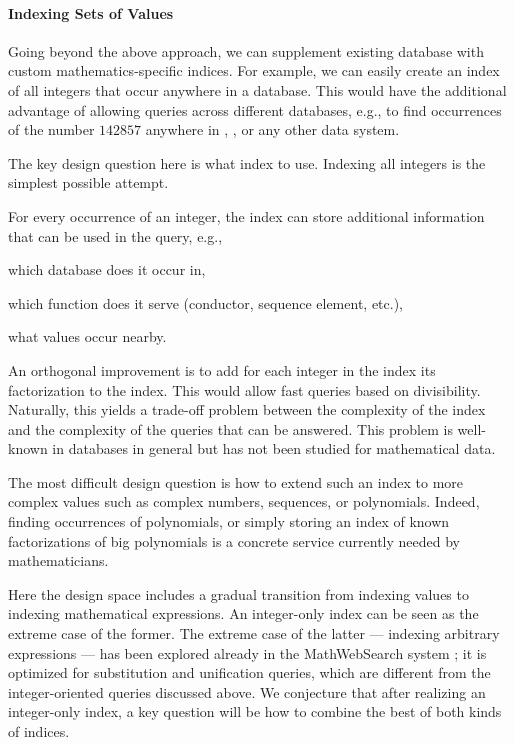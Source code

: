 \paragraph{Indexing Sets of Values}
Going beyond the above approach, we can supplement existing database with custom mathematics-specific indices.
For example, we can easily create an index of all integers that occur anywhere in a database.
This would have the additional advantage of allowing queries across different databases, e.g., to find occurrences of the number $142857$ anywhere in \LMFDB, \OEIS, or any other data system.

The key design question here is what index to use.
Indexing all integers is the simplest possible attempt.

For every occurrence of an integer, the index can store additional information that can be used in the query, e.g.,
\begin{compactitem}
 \item which database does it occur in,
 \item which function does it serve (conductor, sequence element, etc.),
 \item what values occur nearby.
\end{compactitem}

An orthogonal improvement is to add for each integer in the index its factorization to the index.
This would allow fast queries based on divisibility.
Naturally, this yields a trade-off problem between the complexity of the index and the complexity of the queries that can be answered.
This problem is well-known in databases in general but has not been studied for mathematical data.

The most difficult design question is how to extend such an index to more complex values such as complex numbers, sequences, or polynomials.
Indeed, finding occurrences of polynomials, or simply storing an index of known factorizations of big polynomials is a concrete service currently needed by mathematicians.

Here the design space includes a gradual transition from indexing values to indexing mathematical expressions.
An integer-only index can be seen as the extreme case of the former.
The extreme case of the latter --- indexing arbitrary expressions --- has been explored already in the MathWebSearch system \cite{ODK-D6.1}; it is optimized for substitution and unification queries, which are different from the integer-oriented queries discussed above.
We conjecture that after realizing an integer-only index, a key question will be how to combine the best of both kinds of indices.


